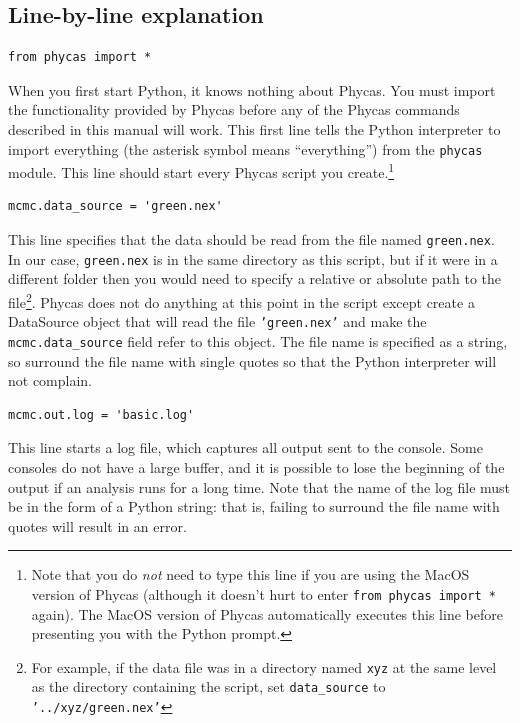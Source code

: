 \documentclass[10pt]{article}
\newcommand{\code}[1]{{\tt #1}}					%
\newcommand{\opt}[1]{{\tt \small #1}\index{#1}}	%
\begin{document}
\subsection{Line-by-line explanation} \label{subsec:basicpyexplanation}
\begin{samepage}
\begin{verbatim}
from phycas import *
\end{verbatim}
When you first start Python, it knows nothing about Phycas. You must import the functionality provided by Phycas before any of the Phycas commands described in this manual will work. This first line tells the Python interpreter to import everything (the asterisk symbol means ``everything'') from the \code{phycas} module. This line should start every Phycas script you create.\footnote{Note that you do {\em not} need to type this line if you are using the MacOS version of Phycas (although it doesn't hurt to enter \code{from phycas import *} again). The MacOS version of Phycas automatically executes this line before presenting you with the Python prompt.}
\end{samepage}

\begin{samepage}
\begin{verbatim}
mcmc.data_source = 'green.nex'
\end{verbatim}
This line specifies that the data should be read from the file named {\tt green.nex}. In our case, {\tt green.nex} is in the same directory as this script, but if it were in a different folder then you would need to specify a relative or absolute path to the file\footnote{
%
For example, if the data file was in a directory named {\tt xyz} at the same level as the directory containing the script, set \opt{data\_source} to {\tt '../xyz/green.nex'} }.
%
Phycas does not do anything at this point in the script except create a DataSource object that will read the file \code{'green.nex'} and make the \opt{mcmc.data\_source} field refer to this object. The file name is specified as a string, so surround the file name with single quotes so that the Python interpreter will not complain. 

\end{samepage}

\begin{samepage}
\begin{verbatim}
mcmc.out.log = 'basic.log'
\end{verbatim}
This line starts a log file, which captures all output sent to the console. Some consoles do not have a large buffer, and it is possible to lose the beginning of the output if an analysis runs for a long time. Note that the name of the log file must be in the form of a Python string: that is, failing to surround the file name with quotes will result in an error.
\end{samepage}
\end{document}
